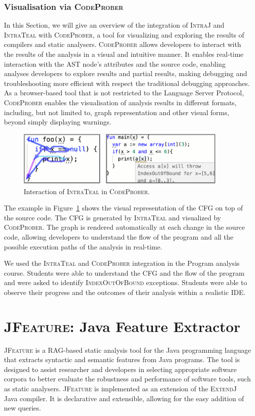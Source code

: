 \subsubsection{Visualisation via \textsc{CodeProber}}
In this Section, we will give an overview of the integration of \textsc{IntraJ} and \textsc{IntraTeal}
with \textsc{CodeProber}, a tool for visualizing and
exploring the results of compilers and static analysers. \textsc{CodeProber}
allows developers to interact with the results of the analysis in a visual and intuitive
manner. It enables real-time interaction with the AST node's attributes and the source code,
enabling analyses developers to explore results and partial results, making
debugging and troubleshooting more efficient with respect the traditional debugging
approaches. As a browser-based tool that is not restricted to the Language Server Protocol,
\textsc{CodeProber} enables the visualisation of analysis results in different
formats, including, but not limited to, graph representation and other visual forms, beyond
simply displaying warnings.
\begin{figure}[H]
  \centering
  \includegraphics[width=0.92\textwidth]{kappa/img/CP.pdf}
  \caption{\label{fig:CodeProber} Interaction of \textsc{IntraTeal} in \textsc{CodeProber}.}
\end{figure}
The example in Figure~\ref{fig:CodeProber} shows the visual representation of the CFG on
top of the source code. The CFG is generated by \textsc{IntraTeal} and visualized by
\textsc{CodeProber}. The graph is rendered automatically at each change in the source code,
allowing developers to understand the flow of the program and all the possible execution paths of the
analysis in real-time.

We used the \textsc{IntraTeal} and \textsc{CodeProber} integration in the Program analysis
course. Students were able to understand the CFG and the flow of the program and
were asked to identify \textsc{IndexOutOfBound} exceptions. Students were able to
observe their progress and the outcomes of their analysis within a realistic IDE.



\section{\textsc{JFeature}: Java Feature Extractor}
\label{sec:JFeature}
\textsc{JFeature} is a RAG-based static analysis tool for the Java programming language that extracts
syntactic and semantic features from Java programs. The tool is designed to assist
researcher and developers in selecting appropriate software corpora to better evaluate the robustness
and performance of software tools, such as static analysers.
\textsc{JFeature} is implemented as an extension of the \textsc{ExtendJ} Java compiler. It is declarative
and extensible, allowing for the easy addition of new queries.

